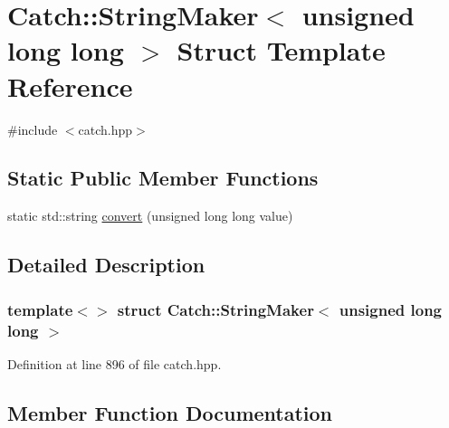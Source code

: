 \hypertarget{struct_catch_1_1_string_maker_3_01unsigned_01long_01long_01_4}{}\section{Catch\+:\+:String\+Maker$<$ unsigned long long $>$ Struct Template Reference}
\label{struct_catch_1_1_string_maker_3_01unsigned_01long_01long_01_4}


{\ttfamily \#include $<$catch.\+hpp$>$}

\subsection*{Static Public Member Functions}
\begin{DoxyCompactItemize}
\item 
static std\+::string \mbox{\hyperlink{struct_catch_1_1_string_maker_3_01unsigned_01long_01long_01_4_a6a8708af4fc8df3f52d7eab779b6bc6f}{convert}} (unsigned long long value)
\end{DoxyCompactItemize}


\subsection{Detailed Description}
\subsubsection*{template$<$$>$\newline
struct Catch\+::\+String\+Maker$<$ unsigned long long $>$}



Definition at line 896 of file catch.\+hpp.



\subsection{Member Function Documentation}
\mbox{\label{struct_catch_1_1_string_maker_3_01unsigned_01long_01long_01_4_a6a8708af4fc8df3f52d7eab779b6bc6f}} 
